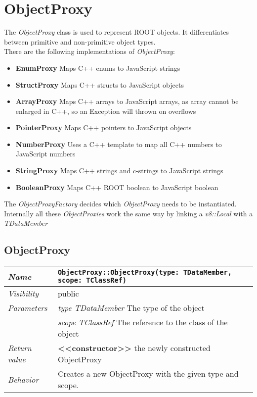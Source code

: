 \chapter{ObjectProxy}
The \textit{ObjectProxy} class is used to represent ROOT objects. It differentiates between primitive and non-primitive object types.\\
There are the following implementations of \textit{ObjectProxy}:
\begin{itemize}
\item \textbf{EnumProxy} Maps C++ enums to JavaScript strings
\item \textbf{StructProxy} Maps C++ structs to JavaScript objects
\item \textbf{ArrayProxy} Maps C++ arrays to JavaScript arrays, as array cannot be enlarged in C++, so an Exception will thrown on overflows
\item \textbf{PointerProxy} Maps C++ pointers to JavaScript objects
\item \textbf{NumberProxy} Uses a C++ template to map all C++ numbers to JavaScript numbers
\item \textbf{StringProxy} Maps C++ strings and c-strings to JavaScript strings
\item \textbf{BooleanProxy} Maps C++ ROOT boolean to JavaScript boolean
\end{itemize}
The \textit{ObjectProxyFactory} decides which \textit{ObjectProxy} needs to be instantiated.
Internally all these \textit{ObjectProxies} work the same way by linking a \textit{v8::Local} with a \textit{TDataMember}
\section{ObjectProxy}
\begin{longtable}{p{3cm} @{\hskip 1cm} p{12cm}}
 \hline
\textit{Name} & \texttt{ObjectProxy::ObjectProxy(type: TDataMember, scope: TClassRef)}\\
\hline
 \textit{Visibility} & public\\
\hline
\textit{Parameters} & \textit{type TDataMember} The type of the object \\ & \textit{scope TClassRef} The reference to the class of the object \\
\hline
\textit{Return value} & \textbf{<<constructor>>} the newly constructed ObjectProxy\\
  \hline
  \textit{Behavior} & Creates a new ObjectProxy with the given type and scope.\\
\hline
\end{longtable} 
